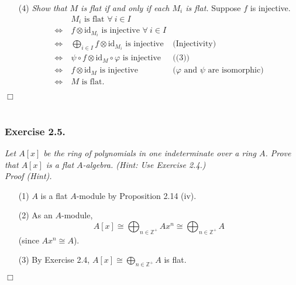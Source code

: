 \documentclass{article}
\begin{document}
\begin{enumerate}
\item[(4)]
  \emph{Show that $M$ is flat if and only if each $M_i$ is flat.}
  Suppose $f$ is injective.
  \begin{align*}
    &\:
    \text{$M_i$ is flat $\forall \: i \in I$} \\
    \Longleftrightarrow & \:
    \text{$f \otimes \text{id}_{M_i}$ is injective $\forall \: i \in I$} \\
    \Longleftrightarrow & \:
    \text{$\bigoplus_{i \in I} f \otimes \text{id}_{M_i}$ is injective}
      &\text{(Injectivity)} \\
    \Longleftrightarrow & \:
    \text{$\psi \circ f \otimes \text{id}_{M} \circ \varphi$ is injective}
      &\text{((3))} \\
    \Longleftrightarrow & \:
    \text{$f \otimes \text{id}_{M}$ is injective}
      &\text{($\varphi$ and $\psi$ are isomorphic)} \\
    \Longleftrightarrow & \:
    \text{$M$ is flat}.
  \end{align*}
\end{enumerate}
$\Box$ \\\\






\subsubsection*{Exercise 2.5.}
\emph{Let $A[x]$ be the ring of polynomials in one indeterminate over a ring $A$.
Prove that $A[x]$ is a flat $A$-algebra. (Hint: Use Exercise 2.4.)} \\

\emph{Proof (Hint).}
\begin{enumerate}
\item[(1)]
  $A$ is a flat $A$-module by Proposition 2.14 (iv).

\item[(2)]
  As an $A$-module,
  \[
    A[x]
    \cong \bigoplus_{n \in \mathbb{Z}^+} Ax^n
    \cong \bigoplus_{n \in \mathbb{Z}^+} A
  \]
  (since $Ax^n \cong A$).

\item[(3)]
  By Exercise 2.4, $A[x] \cong \bigoplus_{n \in \mathbb{Z}^+} A$ is flat.
\end{enumerate}
$\Box$ \\\\
\end{document}
